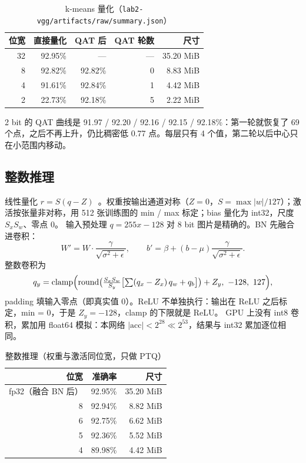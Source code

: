 \documentclass[11pt,a4paper]{ctexart}
\begin{document}
\begin{table}[H]
\centering\small
\caption{k-means 量化（\texttt{lab2-vgg/artifacts/raw/summary.json}）}\label{tab:km}
\begin{tabular}{rrrrr}
\toprule
位宽 & 直接量化 & QAT 后 & QAT 轮数 & 尺寸 \\
\midrule
32 & 92.95\% & — & — & 35.20 MiB \\
8 & 92.82\% & 92.82\% & 0 & 8.83 MiB \\
4 & 91.61\% & 92.84\% & 1 & 4.42 MiB \\
2 & 22.73\% & 92.18\% & 5 & 2.22 MiB \\
\bottomrule
\end{tabular}
\end{table}

2 bit 的 QAT 曲线是 91.97 / 92.20 / 92.16 / 92.15 / 92.18\%：第一轮就恢复了 69 个点，之后不再上升，仍比稠密低 0.77 点。每层只有 4 个值，第二轮以后中心只在小范围内移动。

\subsection{整数推理}
线性量化 $r = S(q - Z)$~\cite{jacob2018}。权重按输出通道对称（$Z=0$，$S=\max|w|/127$）；激活按张量非对称，用 512 张训练图的 min / max 标定；bias 量化为 int32，尺度 $S_xS_w$、零点 0。
输入预处理 $q=255x-128$ 对 8 bit 图片是精确的。BN 先融合进卷积：
\begin{equation}
W' = W\cdot\frac{\gamma}{\sqrt{\sigma^2+\epsilon}},\qquad b' = \beta + (b-\mu)\frac{\gamma}{\sqrt{\sigma^2+\epsilon}} .
\end{equation}
整数卷积为
\begin{equation}
q_y = \mathrm{clamp}\Bigl(\mathrm{round}\bigl(\tfrac{S_xS_w}{S_y}\bigl[\textstyle\sum (q_x - Z_x)\,q_w + q_b\bigr]\bigr) + Z_y,\ -128,\ 127\Bigr),
\end{equation}
padding 填输入零点（即真实值 0）。ReLU 不单独执行：输出在 ReLU 之后标定，min = 0，于是 $Z_y=-128$，clamp 的下限就是 ReLU。
GPU 上没有 int8 卷积，累加用 float64 模拟：本网络 $|\text{acc}|<2^{28}\ll 2^{53}$，结果与 int32 累加逐位相同。

\begin{table}[H]
\centering\small
\caption{整数推理（权重与激活同位宽，只做 PTQ）}\label{tab:lin}
\begin{tabular}{rrr}
\toprule
位宽 & 准确率 & 尺寸 \\
\midrule
fp32（融合 BN 后） & 92.95\% & 35.20 MiB \\
8 & 92.94\% & 8.82 MiB \\
6 & 92.75\% & 6.62 MiB \\
5 & 92.36\% & 5.52 MiB \\
4 & 89.98\% & 4.42 MiB \\
\bottomrule
\end{tabular}
\end{table}
\end{document}
